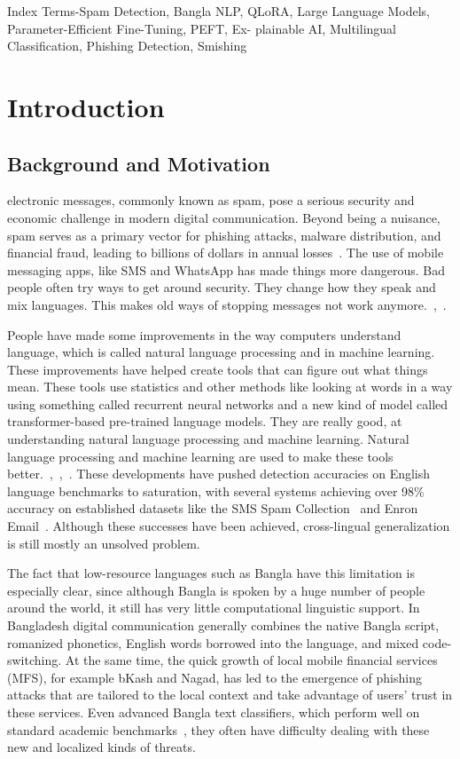 \documentclass[journal]{IEEEtran}
\begin{document}
\begin{IEEEkeywords}
Index Terms-Spam Detection, Bangla NLP, QLoRA, Large
Language Models, Parameter-Efficient Fine-Tuning, PEFT, Ex-
plainable AI, Multilingual Classification, Phishing Detection,
Smishing
\end{IEEEkeywords}

\section{Introduction}

\subsection{Background and Motivation}

 electronic messages, commonly known as
spam, pose a serious security and economic challenge in modern digital communication. Beyond being a nuisance, spam serves as a primary vector for phishing attacks, malware distribution, and financial fraud, leading to billions of dollars in annual losses~\cite{ref1}. The use of mobile messaging apps, like SMS and WhatsApp has made things more dangerous. Bad people often try ways to get around security. They change how they speak and mix languages. This makes old ways of stopping messages not work anymore.~\cite{ref5},~\cite{ref6}.

People have made some improvements in the way computers understand language, which is called natural language processing and in machine learning. These improvements have helped create tools that can figure out what things mean. These tools use statistics and other methods like looking at words in a way using something called recurrent neural networks and a new kind of model called transformer-based pre-trained language models. They are really good, at understanding natural language processing and machine learning. Natural language processing and machine learning are used to make these tools better.~\cite{ref4},~\cite{ref7},~\cite{ref9}. These developments have pushed detection accuracies on English language benchmarks to saturation, with several systems achieving over 98\% accuracy on established datasets like the SMS Spam Collection~\cite{ref1} and Enron Email~\cite{ref9}. Although these successes have been achieved, cross-lingual generalization is still mostly an unsolved problem.

The fact that low-resource languages such as Bangla have this limitation is especially clear, since although Bangla is spoken by a huge number of people around the world, it still has very little computational linguistic support. In Bangladesh digital communication generally combines the native Bangla script, romanized phonetics, English words borrowed into the language, and mixed code-switching. At the same time, the quick growth of local mobile financial services (MFS), for example bKash and Nagad, has led to the emergence of phishing attacks that are tailored to the local context and take advantage of users' trust in these services. Even advanced Bangla text classifiers, which perform well on standard academic benchmarks~\cite{ref7}, they often have difficulty dealing with these new and localized kinds of threats.
\end{document}
